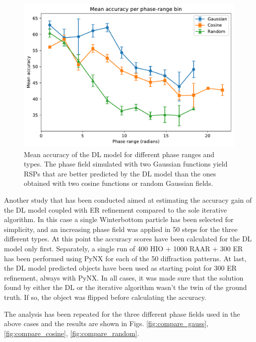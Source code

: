 \begin{figure}[H]
    \centering
    \includegraphics[width=\textwidth]{figures/Phasing/plot_acc_comp_allFINAL.pdf}
    \caption{Mean accuracy of the DL model for different phase ranges and types. The phase field simulated with two Gaussian 
    functions yield RSPs that are better predicted by the DL model than the ones obtained with two cosine functions or 
    random Gaussian fields. }
    \label{fig:compa_all}
\end{figure}

Another study that has been conducted aimed at estimating the accuracy gain of the DL model coupled with ER refinement 
compared to the sole iterative algorithm. In this case a single Winterbottom particle has been selected for simplicity, 
and an increasing phase field was applied in 50 steps for the three different types. At this point the accuracy scores 
have been calculated for the DL model only first. Separately, a single run of 400 HIO + 1000 RAAR + 300 ER has been 
performed using PyNX for each of the 50 diffraction patterns. At last, the DL model predicted objects have been used
as starting point for 300 ER refinement, always with PyNX. In all cases, it was made sure that the solution found by either 
the DL or the iterative algorithm wasn't the twin of the ground truth. If so, the object was flipped before calculating 
the accuracy. 

The analysis has been repeated for the three different phase fields used in the above cases and the results are 
shown in Figs. \ref{fig:compare_gauss}, \ref{fig:compare_cosine}, \ref{fig:compare_random}. 

